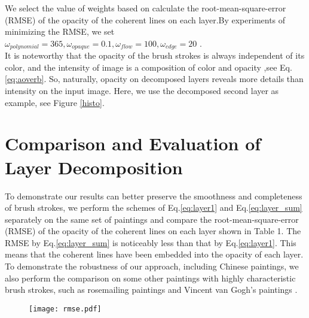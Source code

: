 We select the value of weights based on calculate the root-mean-square-error (RMSE) of the opacity of the coherent lines on each layer.By experiments of minimizing the RMSE, we set $\omega_{polynomial}=365, \omega_{opaque}=0.1,\omega_{flow}=100, \omega_{edge}=20 $ . \\
It is noteworthy that the opacity of the brush strokes is always independent of its color, and the intensity of image is a composition of color and opacity ,see Eq.\ref{eq:aoverb}. So, naturally, opacity on decomposed layers reveals more details than intensity on the input image. Here, we use the decomposed second layer as example, see Figure \ref{histo}. 

\section{Comparison and Evaluation of Layer Decomposition} \label{comparelayer}
To demonstrate our results can better preserve the smoothness and completeness of brush strokes, we perform the schemes of Eq.\ref{eq:layer1} and Eq.\ref{eq:layer_sum} separately on the same set of  paintings and compare the root-mean-square-error (RMSE) of the opacity of the coherent lines on each layer shown in Table 1. The RMSE by Eq.\ref{eq:layer_sum} is noticeably less than that by Eq.\ref{eq:layer1}. This means that the coherent lines have been embedded into the opacity of each layer. \\
To demonstrate the robustness of our approach, including Chinese paintings, we also perform the comparison on some other paintings with highly characteristic brush strokes, such as rosemailing paintings\cite{ellingsgard1978rosemaling} and Vincent van Gogh's paintings\cite{li2012rhythmic} . 

\begin{figure}
	\centering
	\texttt{[image: rmse.pdf]}
	\label{table1}

\end{figure}

















